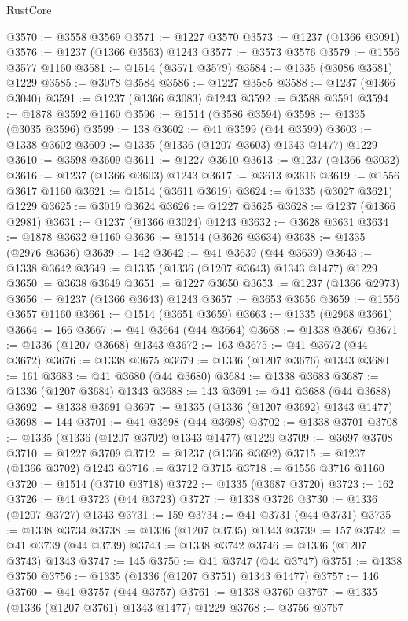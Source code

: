 \begin{lexlean}{RustCore}
\begin{coremodule}
@3570 := @3558 @3569
@3571 := @1227 @3570
@3573 := @1237 (@1366 @3091)
@3576 := @1237 (@1366 @3563) @1243
@3577 := @3573 @3576
@3579 := @1556 @3577 @1160
@3581 := @1514 (@3571 @3579)
@3584 := @1335 (@3086 @3581) @1229
@3585 := @3078 @3584
@3586 := @1227 @3585
@3588 := @1237 (@1366 @3040)
@3591 := @1237 (@1366 @3083) @1243
@3592 := @3588 @3591
@3594 := @1878 @3592 @1160
@3596 := @1514 (@3586 @3594)
@3598 := @1335 (@3035 @3596)
@3599 := 138
@3602 := @41 @3599 (@44 @3599)
@3603 := @1338 @3602
@3609 := @1335 (@1336 (@1207 @3603) @1343 @1477) @1229
@3610 := @3598 @3609
@3611 := @1227 @3610
@3613 := @1237 (@1366 @3032)
@3616 := @1237 (@1366 @3603) @1243
@3617 := @3613 @3616
@3619 := @1556 @3617 @1160
@3621 := @1514 (@3611 @3619)
@3624 := @1335 (@3027 @3621) @1229
@3625 := @3019 @3624
@3626 := @1227 @3625
@3628 := @1237 (@1366 @2981)
@3631 := @1237 (@1366 @3024) @1243
@3632 := @3628 @3631
@3634 := @1878 @3632 @1160
@3636 := @1514 (@3626 @3634)
@3638 := @1335 (@2976 @3636)
@3639 := 142
@3642 := @41 @3639 (@44 @3639)
@3643 := @1338 @3642
@3649 := @1335 (@1336 (@1207 @3643) @1343 @1477) @1229
@3650 := @3638 @3649
@3651 := @1227 @3650
@3653 := @1237 (@1366 @2973)
@3656 := @1237 (@1366 @3643) @1243
@3657 := @3653 @3656
@3659 := @1556 @3657 @1160
@3661 := @1514 (@3651 @3659)
@3663 := @1335 (@2968 @3661)
@3664 := 166
@3667 := @41 @3664 (@44 @3664)
@3668 := @1338 @3667
@3671 := @1336 (@1207 @3668) @1343
@3672 := 163
@3675 := @41 @3672 (@44 @3672)
@3676 := @1338 @3675
@3679 := @1336 (@1207 @3676) @1343
@3680 := 161
@3683 := @41 @3680 (@44 @3680)
@3684 := @1338 @3683
@3687 := @1336 (@1207 @3684) @1343
@3688 := 143
@3691 := @41 @3688 (@44 @3688)
@3692 := @1338 @3691
@3697 := @1335 (@1336 (@1207 @3692) @1343 @1477)
@3698 := 144
@3701 := @41 @3698 (@44 @3698)
@3702 := @1338 @3701
@3708 := @1335 (@1336 (@1207 @3702) @1343 @1477) @1229
@3709 := @3697 @3708
@3710 := @1227 @3709
@3712 := @1237 (@1366 @3692)
@3715 := @1237 (@1366 @3702) @1243
@3716 := @3712 @3715
@3718 := @1556 @3716 @1160
@3720 := @1514 (@3710 @3718)
@3722 := @1335 (@3687 @3720)
@3723 := 162
@3726 := @41 @3723 (@44 @3723)
@3727 := @1338 @3726
@3730 := @1336 (@1207 @3727) @1343
@3731 := 159
@3734 := @41 @3731 (@44 @3731)
@3735 := @1338 @3734
@3738 := @1336 (@1207 @3735) @1343
@3739 := 157
@3742 := @41 @3739 (@44 @3739)
@3743 := @1338 @3742
@3746 := @1336 (@1207 @3743) @1343
@3747 := 145
@3750 := @41 @3747 (@44 @3747)
@3751 := @1338 @3750
@3756 := @1335 (@1336 (@1207 @3751) @1343 @1477)
@3757 := 146
@3760 := @41 @3757 (@44 @3757)
@3761 := @1338 @3760
@3767 := @1335 (@1336 (@1207 @3761) @1343 @1477) @1229
@3768 := @3756 @3767

\end{coremodule}
\end{lexlean}
